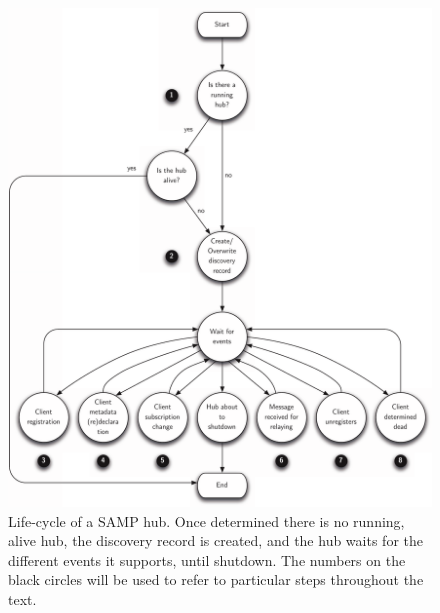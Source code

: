 		\begin{figure}[tbp]
			\centering
				\includegraphics[width=\textwidth]
				{fig/SAMPHubLifeCycle.pdf}
			\caption[Life-cycle of a SAMP hub]
			{
				Life-cycle of a SAMP hub. Once determined there
				is no running, alive hub, the discovery record
				is created, and the hub waits for the different
				events it supports, until shutdown. The numbers
				on the black circles will be used to refer to
				particular steps throughout the text.
			}
			\label{fig:fig_SAMPHubLifeCycle}
		\end{figure}
		

